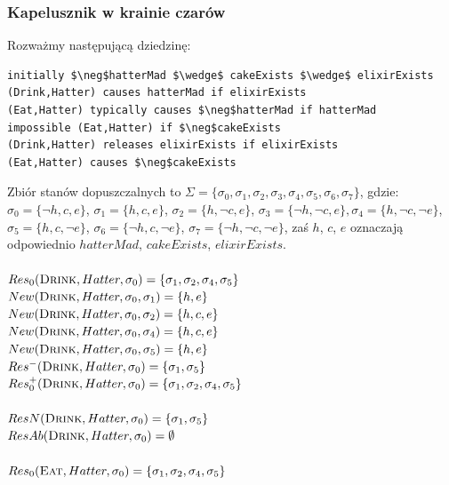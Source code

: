 \documentclass{article}
\begin{document}
\subsubsection{Kapelusznik w krainie czarów}

Rozważmy następującą dziedzinę:
\bigskip
{}
\begin{lstlisting}[mathescape=true]
initially $\neg$hatterMad $\wedge$ cakeExists $\wedge$ elixirExists
(Drink,Hatter) causes hatterMad if elixirExists
(Eat,Hatter) typically causes $\neg$hatterMad if hatterMad
impossible (Eat,Hatter) if $\neg$cakeExists
(Drink,Hatter) releases elixirExists if elixirExists
(Eat,Hatter) causes $\neg$cakeExists
\end{lstlisting}
Zbiór stanów dopuszczalnych to $\Sigma=\{\sigma_{0},\sigma_{1},\sigma_{2},\sigma_{3},\sigma_{4},\sigma_{5},\sigma_{6},\sigma_{7}\}$, gdzie:\\
$\sigma_{0}=\{\neg h,c, e\}$, $\sigma_{1}=\{h, c, e\}$, $\sigma_{2}=\{h, \neg c, e\}$, $\sigma_{3}=\{\neg h,\neg c, e\}, \sigma_{4}=\{h,\neg c, \neg e\}$, $\sigma_{5}=\{h, c, \neg e\}$, $\sigma_{6}=\{\neg h, c, \neg e\}$, $\sigma_{7}=\{\neg h,\neg c, \neg e\}$, zaś $h$, $c$, $e$ oznaczają odpowiednio $hatterMad$, $cakeExists$, $elixirExists$.\\\\
$Res_{0}(\textsc{Drink},Hatter,\sigma_{0})=\{\sigma_{1}, \sigma_{2}, \sigma_{4}, \sigma_{5}\}$\\
$New(\textsc{Drink},Hatter,\sigma_{0},\sigma_{1})=\{h, e\}$\\
$New(\textsc{Drink},Hatter,\sigma_{0},\sigma_{2})=\{h, c, e\}$\\
$New(\textsc{Drink},Hatter,\sigma_{0},\sigma_{4})=\{h, c, e\}$\\
$New(\textsc{Drink},Hatter,\sigma_{0},\sigma_{5})=\{h, e\}$\\
$Res^{-}(\textsc{Drink},Hatter,\sigma_{0})=\{\sigma_{1}, \sigma_{5}\}$\\
$Res_{0}^{+}(\textsc{Drink},Hatter,\sigma_{0})=\{\sigma_{1}, \sigma_{2}, \sigma_{4}, \sigma_{5}\}$\\\\
$ResN(\textsc{Drink},Hatter,\sigma_{0})=\{\sigma_{1}, \sigma_{5}\}$\\
$ResAb(\textsc{Drink},Hatter,\sigma_{0})=\emptyset$\\\\
$Res_{0}(\textsc{Eat},Hatter,\sigma_{0})=\{\sigma_{1}, \sigma_{2}, \sigma_{4}, \sigma_{5}\}$\\
\end{document}

